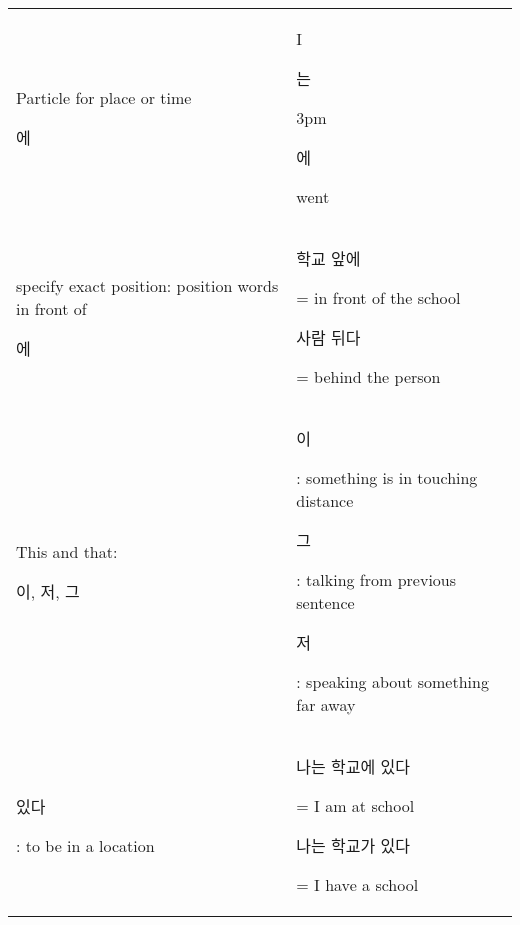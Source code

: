 \begin{tabular}{p{200pt}p{200pt}}
\hline
	Particle for place or time \begin{Korean}에\end{Korean} &
	I\begin{Korean}는\end{Korean} 3pm \begin{Korean}에\end{Korean} went\\

	specify exact position: position words in front of \begin{Korean}에\end{Korean} &
	\begin{Korean}학교 앞에\end{Korean} = in front of the school\newline
	\begin{Korean}사람 뒤다\end{Korean} = behind the person\\
\hline
	This and that: \begin{Korean}이, 저, 그\end{Korean}&
	\begin{Korean}이\end{Korean}: something is in touching distance\newline
	\begin{Korean}그\end{Korean}: talking from previous sentence\newline
	\begin{Korean}저\end{Korean}: speaking about something far away\\
\hline
	 \begin{Korean}있다\end{Korean}: to be in a location&
	 \begin{Korean}나는 학교에 있다\end{Korean} = I am at school\newline
	 \begin{Korean}나는 학교가 있다\end{Korean} = I have a school\\
\hline		

\end{tabular}

